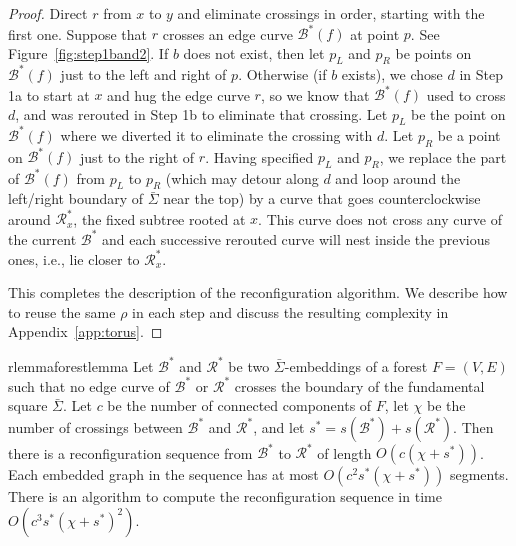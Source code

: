 \documentclass[a4paper,USenglish,cleveref,colorlinks=true,urlcolor=black,linkcolor=black,citecolor=black,thm-restate,authorcolumns]{lipics-v2021}
\newcommand{\prooflink}[1]{\hypersetup{linkcolor=lipicsBulletGray}\hyperref[#1]{$\blacktriangledown$}}
\newcommand{\statlink}[1]{\hypersetup{linkcolor=lipicsYellow}\hyperref[#1]{$\blacktriangle$}}
\newcommand{\mylink}{}
\theoremstyle{claimstyle}
\begin{document}
\begin{proof}
    Direct $r$ from $x$ to $y$ and eliminate crossings in order, starting with the first one.
    Suppose that $r$ crosses an edge curve ${\mathcal B}^* (f)$ at point $p$.
    See Figure~\ref{fig:step1band2}.
    If $b$ does not exist, then let $p_L$ and $p_R$ be points on ${\mathcal B}^* (f)$ just to the left and right of $p$.
    Otherwise (if $b$ exists),
    we chose $d$ in Step 1a to start at $x$ and hug the edge curve $r$,
    so we know that ${\mathcal B}^* (f)$ used to cross $d$, and was rerouted in Step 1b to eliminate that crossing.
    Let $p_L$ be the point on ${\mathcal B}^* (f)$ where we diverted it to eliminate the crossing with $d$.
    Let $p_R$ be a point on ${\mathcal B}^* (f)$ just to the right of $r$.
    Having specified $p_L$ and $p_R$, we replace the part of ${\mathcal B}^* (f)$ from $p_L$ to $p_R$
    (which may detour along $d$ and loop around the left/right boundary of $\bar\Sigma$ near the top)
    by a curve that goes counterclockwise around ${\mathcal R}^*_x$, the fixed subtree rooted at $x$.
    This curve does not cross any curve of the current ${\mathcal B}^*$ and each successive rerouted curve will nest inside the previous ones, i.e., lie closer to ${\mathcal R}^*_x$.

\medskip
    This completes the description of the reconfiguration algorithm. We describe how to  reuse the same $\rho$ in each step and discuss the resulting complexity  in  Appendix~\ref{app:torus}.
\end{proof}


\begin{restatable}{rlemma}{forestlemma}
    \label{lem:reconfiguration-of-two-plane-embeddings}
    \renewcommand{\mylink}{\statlink{lem:reconfiguration-of-two-plane-embeddings}\prooflink{Pforestlemma}}
    Let $\mathcal{B}^*$ and $\mathcal{R}^*$ be two $\bar{\Sigma}$-embeddings of a forest $F=(V,E)$ such that no edge curve of $\mathcal{B}^*$ or $\mathcal{R}^*$ crosses the boundary of the fundamental square $\bar{\Sigma}$.
    Let $c$ be the number of connected components of $F$, let $\chi$ be the number of crossings between
    $\mathcal{B}^*$ and
    $\mathcal{R}^*$, and let $s^* = s(\mathcal{B}^*) + s(\mathcal{R}^*) $.
    Then there is a reconfiguration sequence from $\mathcal{B}^*$ to
    $\mathcal{R}^*$
    of length $O(c(\chi + s^*))$.
    Each embedded graph in the sequence has at most $O(c^2 s^*(\chi + s^*))$ segments.
    There is an algorithm to compute the reconfiguration sequence in time $O(c^3 s^*(\chi + s^*)^2)$.
\end{restatable}
\end{document}
